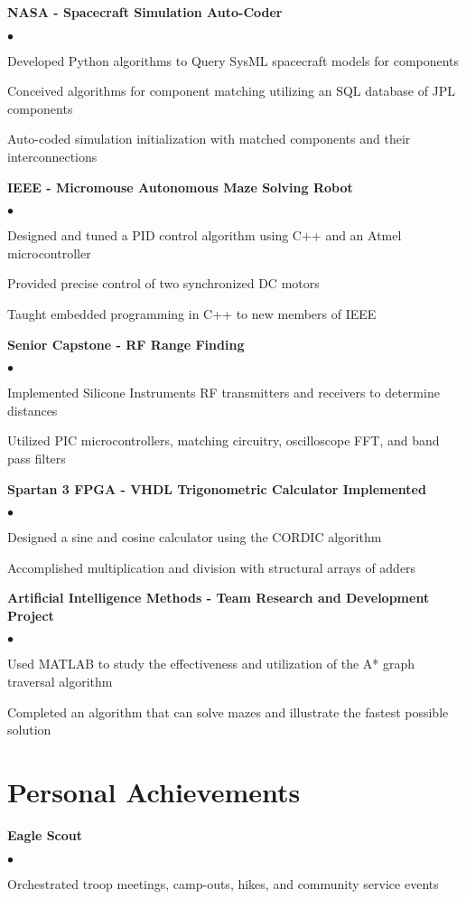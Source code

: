 \documentclass[margin,line]{res}
\newenvironment{list2}{
  \begin{list}{$\bullet$}{%
      \setlength{\itemsep}{0in}
      \setlength{\parsep}{0in} \setlength{\parskip}{0in}
      \setlength{\topsep}{0in} \setlength{\partopsep}{0in}
      \setlength{\leftmargin}{0.2in}}}{\end{list}}
\begin{document}
\begin{resume}
{\bf NASA - Spacecraft Simulation Auto-Coder}
\begin{list2}
\item Developed Python algorithms to Query SysML spacecraft models for components
\item Conceived algorithms for component matching utilizing an SQL database of JPL components 
\item Auto-coded simulation initialization with matched components and their interconnections
\end{list2}

{\bf IEEE - Micromouse Autonomous Maze Solving Robot}
\begin{list2}
\item Designed and tuned a PID control algorithm using C++ and an Atmel microcontroller 
\item Provided precise control of two synchronized DC motors
\item Taught embedded programming in C++ to new members of IEEE 
\end{list2}


{\bf Senior Capstone - RF Range Finding}
\begin{list2}
\item Implemented Silicone Instruments RF transmitters and receivers to determine distances
\item Utilized PIC microcontrollers, matching circuitry, oscilloscope FFT, and band pass filters 
\end{list2}


{\bf Spartan 3 FPGA - VHDL Trigonometric Calculator Implemented}
\begin{list2}
\item Designed a sine and cosine calculator using the CORDIC algorithm
\item Accomplished multiplication and division with structural arrays of adders
\end{list2}


{\bf Artificial Intelligence Methods - Team Research and Development Project}
\begin{list2}
\item Used MATLAB to study the effectiveness and utilization of the A* graph traversal algorithm 
\item Completed an algorithm that can solve mazes and illustrate the fastest possible solution
\end{list2}

\section{\sc Personal Achievements}
{\bf Eagle Scout}
\begin{list2}
\item Orchestrated troop meetings, camp-outs, hikes, and community service events  
\end{list2}


\end{resume}
\end{document}
